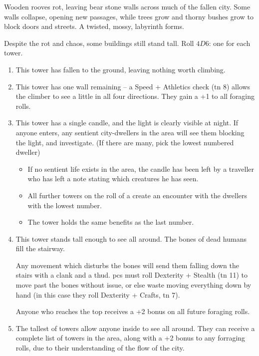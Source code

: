 \begin{multicols}{2}
\label{lostTowers}

Wooden rooves rot, leaving bear stone walls across much of the fallen city.
Some walls collapse, opening new passages, while trees grow and thorny bushes grow to block doors and streets.
A twisted, mossy, labyrinth forms.

Despite the rot and chaos, some buildings still stand tall.
Roll $4D6$: one for each tower.

\begin{enumerate}
  \item
  This tower has fallen to the ground, leaving nothing worth climbing.
  \item
  This tower has one wall remaining -- a Speed + Athletics check (\gls{tn} 8) allows the climber to see a little in all four directions.
  They gain a +1 to all foraging rolls.
  \item
  This tower has a single candle, and the light is clearly visible at night.
  If anyone enters, any sentient city-dwellers in the area will see them blocking the light, and investigate.
  (If there are many, pick the lowest numbered dweller)
  \begin{itemize}
    \item
    If no sentient life exists in the area, the candle has been left by a traveller who has left a note stating which creatures he has seen.
    \item
    All further towers on the roll of a  create an encounter with the dwellers with the lowest number.
    \item
    The tower holds the same benefits as the last number.
  \end{itemize}
  \item
  This tower stands tall enough to see all around.
  The bones of dead humans fill the stairway.

  Any movement which disturbs the bones will send them falling down the stairs with a clank and a thud.
  \Glspl{pc} must roll Dexterity + Stealth (\gls{tn} 11) to move past the bones without issue, or else waste  moving everything down by hand (in this case they roll Dexterity + Crafts, \gls{tn} 7).

  Anyone who reaches the top receives a +2 bonus on all future foraging rolls.
  \item
  The tallest of towers allow anyone inside to see all around.
  They can receive a complete list of towers in the area, along with a +2 bonus to any forraging rolls, due to their understanding of the flow of the city.


\end{enumerate}
\end{multicols}
